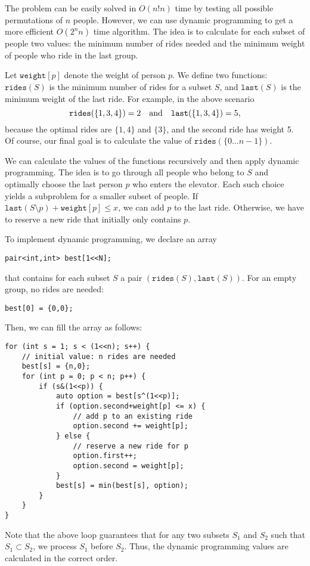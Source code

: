The problem can be easily solved in $O(n! n)$ time
by testing all possible permutations of $n$ people.
However, we can use dynamic programming to get
a more efficient $O(2^n n)$ time algorithm.
The idea is to calculate for each subset of people
two values: the minimum number of rides needed and
the minimum weight of people who ride in the last group.

Let $\texttt{weight}[p]$ denote the weight of
person $p$.
We define two functions:
$\texttt{rides}(S)$ is the minimum number of
rides for a subset $S$,
and $\texttt{last}(S)$ is the minimum weight
of the last ride.
For example, in the above scenario
\[ \texttt{rides}(\{1,3,4\})=2 \hspace{10px} \textrm{and}
\hspace{10px} \texttt{last}(\{1,3,4\})=5,\]
because the optimal rides are $\{1,4\}$ and $\{3\}$,
and the second ride has weight 5.
Of course, our final goal is to calculate the value
of $\texttt{rides}(\{0 \ldots n-1\})$.

We can calculate the values
of the functions recursively and then apply
dynamic programming.
The idea is to go through all people
who belong to $S$ and optimally
choose the last person $p$ who enters the elevator.
Each such choice yields a subproblem
for a smaller subset of people.
If $\texttt{last}(S \setminus p)+\texttt{weight}[p] \le x$,
we can add $p$ to the last ride.
Otherwise, we have to reserve a new ride
that initially only contains $p$.

To implement dynamic programming,
we declare an array
\begin{lstlisting}
pair<int,int> best[1<<N];
\end{lstlisting}
that contains for each subset $S$
a pair $(\texttt{rides}(S),\texttt{last}(S))$.
For an empty group, no rides are needed:
\begin{lstlisting}
best[0] = {0,0};
\end{lstlisting}
Then, we can fill the array as follows:

\begin{lstlisting}
for (int s = 1; s < (1<<n); s++) {
    // initial value: n rides are needed
    best[s] = {n,0};
    for (int p = 0; p < n; p++) {
        if (s&(1<<p)) {
            auto option = best[s^(1<<p)];
            if (option.second+weight[p] <= x) {
                // add p to an existing ride
                option.second += weight[p];
            } else {
                // reserve a new ride for p
                option.first++;
                option.second = weight[p];
            }
            best[s] = min(best[s], option);
        }
    }
}
\end{lstlisting}
Note that the above loop guarantees that
for any two subsets $S_1$ and $S_2$
such that $S_1 \subset S_2$, we process $S_1$ before $S_2$.
Thus, the dynamic programming values are calculated in the
correct order.

